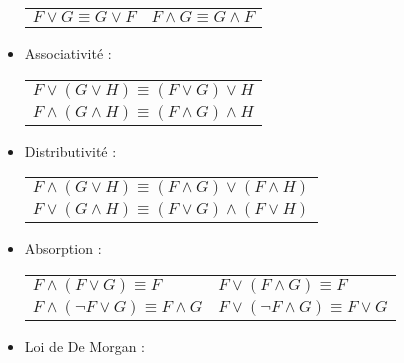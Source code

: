 \documentclass[11pt,twoside,openright,a4paper]{report}
\begin{document}
\begin{itemize}
	\begin{center}

		\begin{tabular}{lr}
			$F \lor G \equiv G \lor F$ & $F \land G \equiv G \land F$ \\
		\end{tabular}
	
	\end{center}

	\item Associativité :\\

	\begin{center}

		\begin{tabular}{c}
			$F \lor (G \lor H) \equiv (F \lor G) \lor H$ \\
			$F \land (G \land H) \equiv (F \land G) \land H$ \\
		\end{tabular}
	
	\end{center}

	\item Distributivité :\\

	\begin{center}

		\begin{tabular}{c}
			$F \land (G \lor H) \equiv (F \land G) \lor (F \land H)$ \\
			$F \lor (G \land H) \equiv (F \lor G) \land (F \lor H)$ \\
		\end{tabular}
	
	\end{center}

	\item Absorption :\\

	\begin{center}

		\begin{tabular}{ll}
			$F \land (F \lor G) \equiv F$ & $F \lor (F \land G) \equiv F$\\
			$F \land (\neg F \lor G) \equiv F \land G$ & $F \lor (\neg F \land G) \equiv F \lor G$\\
		\end{tabular}
	
	\end{center}

	\item Loi de De Morgan :\\


\end{itemize}
\end{document}
